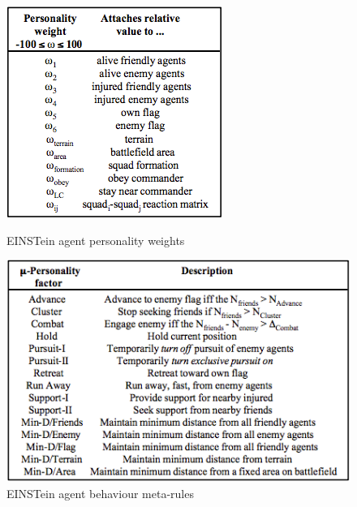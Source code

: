 \documentclass{article}
\begin{document}
\begin{center}
\begin{figure}[H]
\begin{minipage}[H]{0.3\linewidth}
	\centering
	\includegraphics[width=\textwidth]{../ressources/einstein_personality_weight}
	\caption{EINSTein agent personality weights}
\end{minipage}
\hfill
\begin{minipage}[H]{0.6\linewidth}
	\centering
	\includegraphics[width=\textwidth]{../ressources/einstein_personality_factor}
	\caption{EINSTein agent behaviour meta-rules}
\end{minipage}
\end{figure}
\end{center}
\end{document}

